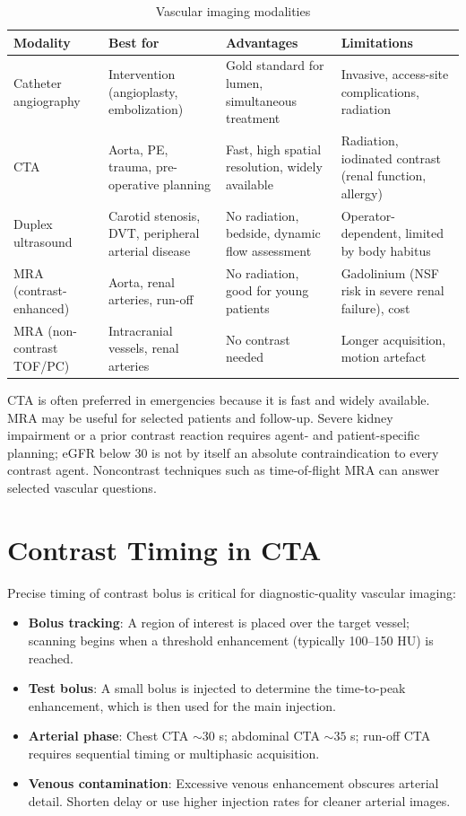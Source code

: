 \begin{table}[h]
\centering
\caption{Vascular imaging modalities}
\begin{tabular}{p{3cm} p{3.5cm} p{3.5cm} p{3.5cm}}
\hline
\textbf{Modality} & \textbf{Best for} & \textbf{Advantages} & \textbf{Limitations} \\
\hline
Catheter angiography & Intervention (angioplasty, embolization) & Gold standard for lumen, simultaneous treatment & Invasive, access-site complications, radiation \\
CTA & Aorta, PE, trauma, pre-operative planning & Fast, high spatial resolution, widely available & Radiation, iodinated contrast (renal function, allergy) \\
Duplex ultrasound & Carotid stenosis, DVT, peripheral arterial disease & No radiation, bedside, dynamic flow assessment & Operator-dependent, limited by body habitus \\
MRA (contrast-enhanced) & Aorta, renal arteries, run-off & No radiation, good for young patients & Gadolinium (NSF risk in severe renal failure), cost \\
MRA (non-contrast TOF/PC) & Intracranial vessels, renal arteries & No contrast needed & Longer acquisition, motion artefact \\
\hline
\end{tabular}
\end{table}

\begin{pearlbox}
CTA is often preferred in emergencies because it is fast and widely available. MRA may be useful for selected patients and follow-up. Severe kidney impairment or a prior contrast reaction requires agent- and patient-specific planning; eGFR below 30 is not by itself an absolute contraindication to every contrast agent. Noncontrast techniques such as time-of-flight MRA can answer selected vascular questions.
\end{pearlbox}


\section{Contrast Timing in CTA}
Precise timing of contrast bolus is critical for diagnostic-quality vascular imaging:
\begin{itemize}
  \item \textbf{Bolus tracking}: A region of interest is placed over the target vessel; scanning begins when a threshold enhancement (typically 100--150 HU) is reached.
  \item \textbf{Test bolus}: A small bolus is injected to determine the time-to-peak enhancement, which is then used for the main injection.
  \item \textbf{Arterial phase}: Chest CTA $\sim 30$ s; abdominal CTA $\sim 35$ s; run-off CTA requires sequential timing or multiphasic acquisition.
  \item \textbf{Venous contamination}: Excessive venous enhancement obscures arterial detail. Shorten delay or use higher injection rates for cleaner arterial images.
\end{itemize}


